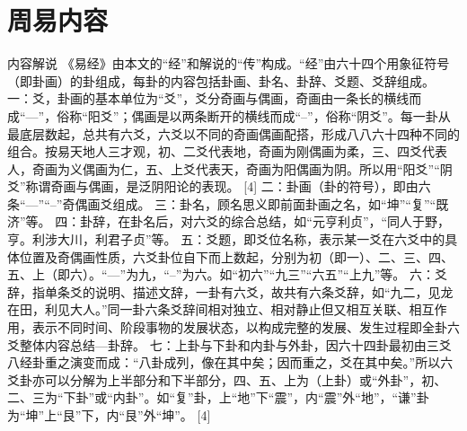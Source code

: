 \documentclass[a4paper,12pt,UTF8,twoside]{ctexbook}
\begin{document}
\section{周易内容}

内容解说
《易经》由本文的“经”和解说的“传”构成。“经”由六十四个用象征符号（即卦画）的卦组成，每卦的内容包括卦画、卦名、卦辞、爻题、爻辞组成。
一：爻，卦画的基本单位为“爻”，爻分奇画与偶画，奇画由一条长的横线而成“—”，俗称“阳爻”；偶画是以两条断开的横线而成“--”，俗称“阴爻”。每一卦从最底层数起，总共有六爻，六爻以不同的奇画偶画配搭，形成八八六十四种不同的组合。按易天地人三才观，初、二爻代表地，奇画为刚偶画为柔，三、四爻代表人，奇画为义偶画为仁，五、上爻代表天，奇画为阳偶画为阴。所以用“阳爻”“阴爻”称谓奇画与偶画，是泛阴阳论的表现。 [4]
二：卦画（卦的符号），即由六条“—”“--”奇偶画爻组成。
三：卦名，顾名思义即前面卦画之名，如“坤”“复”“既济”等。
四：卦辞，在卦名后，对六爻的综合总结，如“元亨利贞”，“同人于野，亨。利涉大川，利君子贞”等。
五：爻题，即爻位名称，表示某一爻在六爻中的具体位置及奇偶画性质，六爻卦位自下而上数起，分别为初（即一）、二、三、四、五、上（即六）。“—”为九，“--”为六。如“初六”“九三”“六五”“上九”等。
六：爻辞，指单条爻的说明、描述文辞，一卦有六爻，故共有六条爻辞，如“九二，见龙在田，利见大人。”同一卦六条爻辞间相对独立、相对静止但又相互关联、相互作用，表示不同时间、阶段事物的发展状态，以构成完整的发展、发生过程即全卦六爻整体内容总结—卦辞。
七：上卦与下卦和内卦与外卦，因六十四卦最初由三爻八经卦重之演变而成：“八卦成列，像在其中矣；因而重之，爻在其中矣。”所以六爻卦亦可以分解为上半部分和下半部分，四、五、上为（上卦）或“外卦”，初、二、三为“下卦”或“内卦”。如“复”卦，上“地”下“震”，内“震”外“地”，“谦”卦为“坤”上“艮”下，内“艮”外“坤”。 [4]
\end{document}
